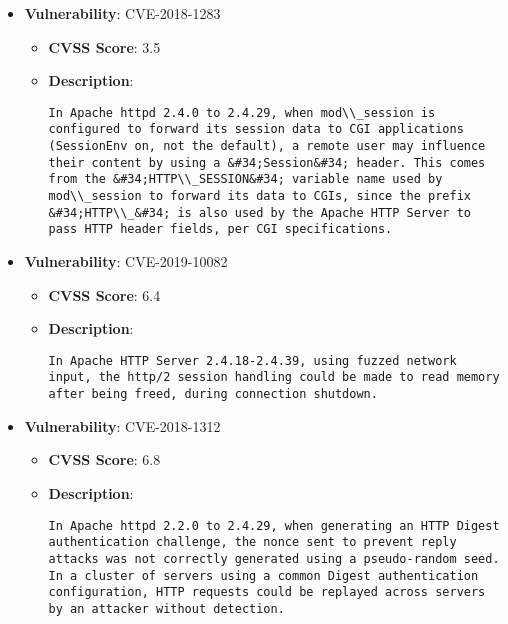 \documentclass{article}
\begin{document}
\begin{itemize}
        \item \textbf{Vulnerability}: CVE-2018-1283
        \begin{itemize}
            \item \textbf{CVSS Score}:  3.5 
            \item \textbf{Description}:
            \parbox[t]{0.9\linewidth}{
                \verb|In Apache httpd 2.4.0 to 2.4.29, when mod\\_session is configured to forward its session data to CGI applications (SessionEnv on, not the default), a remote user may influence their content by using a &#34;Session&#34; header. This comes from the &#34;HTTP\\_SESSION&#34; variable name used by mod\\_session to forward its data to CGIs, since the prefix &#34;HTTP\\_&#34; is also used by the Apache HTTP Server to pass HTTP header fields, per CGI specifications.|
            }
        \end{itemize}
    
        \item \textbf{Vulnerability}: CVE-2019-10082
        \begin{itemize}
            \item \textbf{CVSS Score}:  6.4 
            \item \textbf{Description}:
            \parbox[t]{0.9\linewidth}{
                \verb|In Apache HTTP Server 2.4.18-2.4.39, using fuzzed network input, the http/2 session handling could be made to read memory after being freed, during connection shutdown.|
            }
        \end{itemize}
    
        \item \textbf{Vulnerability}: CVE-2018-1312
        \begin{itemize}
            \item \textbf{CVSS Score}:  6.8 
            \item \textbf{Description}:
            \parbox[t]{0.9\linewidth}{
                \verb|In Apache httpd 2.2.0 to 2.4.29, when generating an HTTP Digest authentication challenge, the nonce sent to prevent reply attacks was not correctly generated using a pseudo-random seed. In a cluster of servers using a common Digest authentication configuration, HTTP requests could be replayed across servers by an attacker without detection.|
            }
        \end{itemize}
    

\end{itemize}
\end{document}
